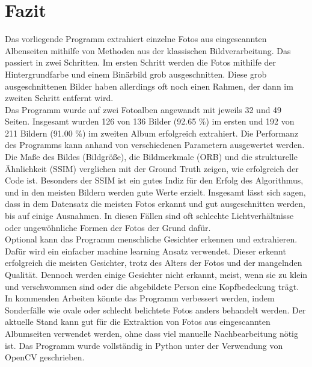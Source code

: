 \chapter{Fazit}
Das vorliegende Programm extrahiert einzelne Fotos aus eingescannten Albenseiten mithilfe von Methoden aus der klassischen Bildverarbeitung. Das passiert in zwei Schritten. Im ersten Schritt werden die Fotos mithilfe der Hintergrundfarbe und einem Binärbild grob ausgeschnitten. Diese grob ausgeschnittenen Bilder haben allerdings oft noch einen Rahmen, der dann im zweiten Schritt entfernt wird.\\
Das Programm wurde auf zwei Fotoalben angewandt mit jeweils 32 und 49 Seiten. Insgesamt wurden 126 von 136 Bilder (92.65 \%) im ersten und 192 von 211 Bildern (91.00 \%) im zweiten Album erfolgreich extrahiert. Die Performanz des Programms kann anhand von verschiedenen Parametern ausgewertet werden. \\
Die Maße des Bildes (Bildgröße), die Bildmerkmale (ORB) und die strukturelle Ähnlichkeit (SSIM) verglichen mit der Ground Truth zeigen, wie erfolgreich der Code ist. Besonders der SSIM ist ein gutes Indiz für den Erfolg des Algorithmus, und in den meisten Bildern werden gute Werte erzielt. Insgesamt lässt sich sagen, dass in dem Datensatz die meisten Fotos erkannt und gut ausgeschnitten werden, bis auf einige Ausnahmen. In diesen Fällen sind oft schlechte Lichtverhältnisse oder ungewöhnliche Formen der Fotos der Grund dafür.\\
Optional kann das Programm menschliche Gesichter erkennen und extrahieren. Dafür wird ein einfacher machine learning Ansatz verwendet. Dieser erkennt erfolgreich die meisten Gesichter, trotz des Alters der Fotos und der mangelnden Qualität. Dennoch werden einige Gesichter nicht erkannt, meist, wenn sie zu klein und verschwommen sind oder die abgebildete Person eine Kopfbedeckung trägt.\\
In kommenden Arbeiten könnte das Programm verbessert werden, indem Sonderfälle wie ovale oder schlecht belichtete Fotos anders behandelt werden. Der aktuelle Stand kann gut für die Extraktion von Fotos aus eingescannten Albumseiten verwendet werden, ohne dass viel manuelle Nachbearbeitung nötig ist. Das Programm wurde vollständig in Python unter der Verwendung von OpenCV geschrieben.